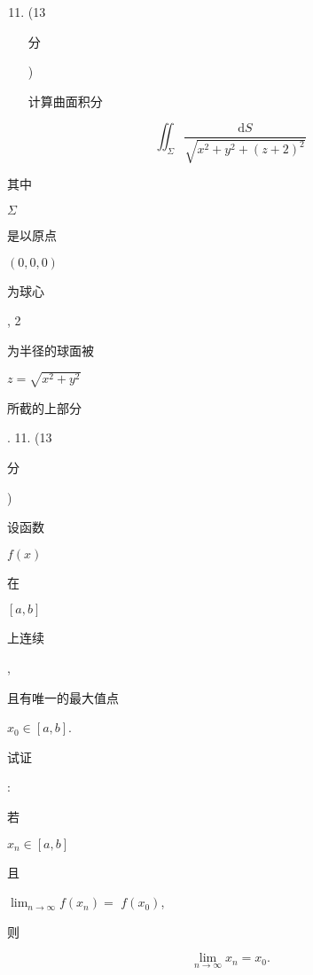 \documentclass[10pt]{article}
\begin{document}
\begin{enumerate}
  \setcounter{enumi}{10}
  \item (13 \begin{CJK}{UTF8}{mj}分\end{CJK}) \begin{CJK}{UTF8}{mj}计算曲面积分\end{CJK}
\end{enumerate}
$$
\iint_{\Sigma} \frac{\mathrm{d} S}{\sqrt{x^{2}+y^{2}+(z+2)^{2}}}
$$
\begin{CJK}{UTF8}{mj}其中\end{CJK} $\Sigma$ \begin{CJK}{UTF8}{mj}是以原点\end{CJK} $(0,0,0)$ \begin{CJK}{UTF8}{mj}为球心\end{CJK}, 2 \begin{CJK}{UTF8}{mj}为半径的球面被\end{CJK} $z=\sqrt{x^{2}+y^{2}}$ \begin{CJK}{UTF8}{mj}所截的上部分\end{CJK}. 11. (13 \begin{CJK}{UTF8}{mj}分\end{CJK}) \begin{CJK}{UTF8}{mj}设函数\end{CJK} $f(x)$ \begin{CJK}{UTF8}{mj}在\end{CJK} $[a, b]$ \begin{CJK}{UTF8}{mj}上连续\end{CJK}, \begin{CJK}{UTF8}{mj}且有唯一的最大值点\end{CJK} $x_{0} \in[a, b]$. \begin{CJK}{UTF8}{mj}试证\end{CJK}: \begin{CJK}{UTF8}{mj}若\end{CJK} $x_{n} \in[a, b]$ \begin{CJK}{UTF8}{mj}且\end{CJK} $\lim _{n \rightarrow \infty} f\left(x_{n}\right)=$ $f\left(x_{0}\right)$, \begin{CJK}{UTF8}{mj}则\end{CJK}
$$
\lim _{n \rightarrow \infty} x_{n}=x_{0} .
$$
\end{document}
